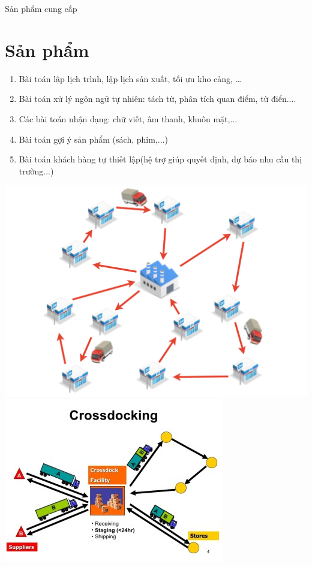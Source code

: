 \documentclass{beamer}
\begin{document}
\begin{frame}{Sản phẩm cung cấp}
\section{Sản phẩm}
\begin{enumerate}
\item Bài toán lập lịch trình, lập lịch sản xuất, tối ưu kho cảng, …

\item Bài toán xử lý ngôn ngữ tự nhiên: tách từ, phân tích quan điểm, từ điển....

\item Các bài toán nhận dạng: chữ viết, âm thanh, khuôn mặt,...
\item Bài toán gợi ý sản phẩm (sách, phim,...)
\item Bài toán khách hàng tự thiết lập(hệ trợ giúp quyết định, dự báo nhu cầu thị trường...)
\end{enumerate}
\includegraphics[scale=0.2]{VHR.png}
\includegraphics[scale=0.2]{CD.jpg}

\end{frame}
\end{document}

